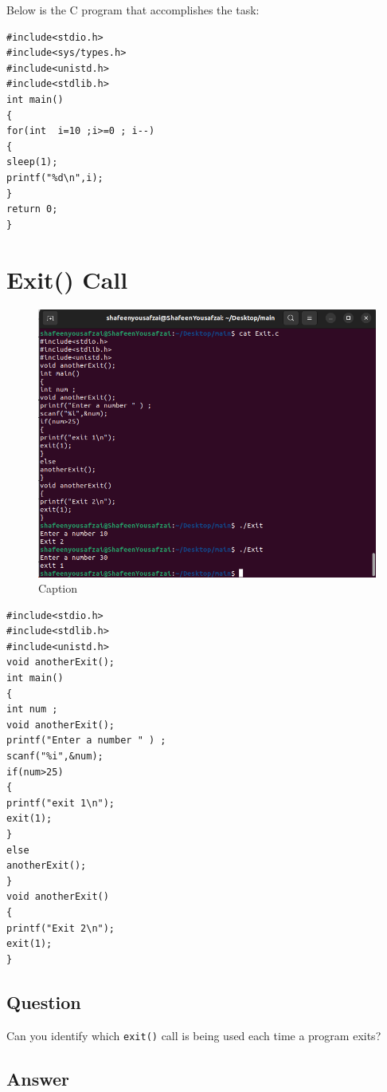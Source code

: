 \documentclass[12pt]{article}
\begin{document}
\bigskip

Below is the C program that accomplishes the task:

\begin{verbatim}
#include<stdio.h>
#include<sys/types.h>
#include<unistd.h>
#include<stdlib.h>
int main() 
{
for(int  i=10 ;i>=0 ; i--)
{
sleep(1);
printf("%d\n",i);
}
return 0;
}
\end{verbatim}

\section{Exit() Call}
\begin{figure}[H]
    \centering
    \includegraphics[width=0.8\linewidth]{image1.png}
    \caption{Caption}
    \label{fig:enter-label}
\end{figure}

\begin{verbatim}
#include<stdio.h>
#include<stdlib.h>
#include<unistd.h>
void anotherExit();
int main()
{
int num ;
void anotherExit();
printf("Enter a number " ) ;
scanf("%i",&num);
if(num>25)
{
printf("exit 1\n");
exit(1);
}
else
anotherExit();
}
void anotherExit()
{
printf("Exit 2\n");
exit(1);
}
\end{verbatim}

\subsection*{Question}

Can you identify which \texttt{exit()} call is being used each time a program exits?

\subsection*{Answer}
\end{document}

